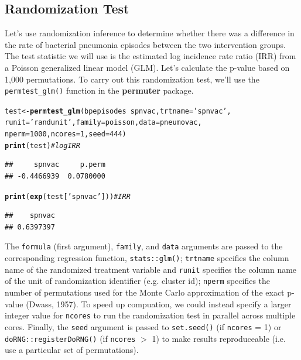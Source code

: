\documentclass[12pt]{article}\usepackage[]{graphicx}\usepackage[]{color}
\makeatletter
\newcommand{\hlnum}[1]{\textcolor[rgb]{0.686,0.059,0.569}{#1}}%
\newcommand{\hlstr}[1]{\textcolor[rgb]{0.192,0.494,0.8}{#1}}%
\newcommand{\hlcom}[1]{\textcolor[rgb]{0.678,0.584,0.686}{\textit{#1}}}%
\newcommand{\hlopt}[1]{\textcolor[rgb]{0,0,0}{#1}}%
\newcommand{\hlstd}[1]{\textcolor[rgb]{0.345,0.345,0.345}{#1}}%
\newcommand{\hlkwb}[1]{\textcolor[rgb]{0.69,0.353,0.396}{#1}}%
\newcommand{\hlkwc}[1]{\textcolor[rgb]{0.333,0.667,0.333}{#1}}%
\newcommand{\hlkwd}[1]{\textcolor[rgb]{0.737,0.353,0.396}{\textbf{#1}}}%
\newenvironment{kframe}{%
 \def\at@end@of@kframe{}%
 \ifinner\ifhmode%
  \def\at@end@of@kframe{\end{minipage}}%
  \begin{minipage}{\columnwidth}%
 \fi\fi%
 \def\FrameCommand##1{\hskip\@totalleftmargin \hskip-\fboxsep
 \colorbox{shadecolor}{##1}\hskip-\fboxsep
     \hskip-\linewidth \hskip-\@totalleftmargin \hskip\columnwidth}%
 \MakeFramed {\advance\hsize-\width
   \@totalleftmargin\z@ \linewidth\hsize
   \@setminipage}}%
 {\par\unskip\endMakeFramed%
 \at@end@of@kframe}
\newenvironment{knitrout}{}{} %
\makeatother
\begin{document}
\subsection{Randomization Test}
Let's use randomization inference to determine whether there was a difference in the rate of bacterial pneumonia episodes between the two intervention groups. The test statistic we will use is the estimated log incidence rate ratio (IRR) from a Poisson generalized linear model (GLM). Let's calculate the p-value based on 1,000 permutations. To carry out this randomization test, we'll use the \texttt{permtest\_glm()} function in the \textbf{permuter} package.
\begin{knitrout}
\color{fgcolor}\begin{kframe}
\begin{alltt}
\hlstd{test} \hlkwb{<-} \hlkwd{permtest_glm}\hlstd{(bpepisodes} \hlopt{~} \hlstd{spnvac,} \hlkwc{trtname} \hlstd{=} \hlstr{'spnvac'}\hlstd{,}
                     \hlkwc{runit} \hlstd{=} \hlstr{'randunit'}\hlstd{,} \hlkwc{family} \hlstd{= poisson,} \hlkwc{data} \hlstd{= pneumovac,}
                     \hlkwc{nperm} \hlstd{=} \hlnum{1000}\hlstd{,} \hlkwc{ncores} \hlstd{=} \hlnum{1}\hlstd{,} \hlkwc{seed} \hlstd{=} \hlnum{444}\hlstd{)}
\hlkwd{print}\hlstd{(test)} \hlcom{# logIRR}
\end{alltt}
\begin{verbatim}
##     spnvac     p.perm 
## -0.4466939  0.0780000
\end{verbatim}
\begin{alltt}
\hlkwd{print}\hlstd{(}\hlkwd{exp}\hlstd{(test[}\hlstr{'spnvac'}\hlstd{]))} \hlcom{# IRR}
\end{alltt}
\begin{verbatim}
##    spnvac 
## 0.6397397
\end{verbatim}
\end{kframe}
\end{knitrout}
The \texttt{formula} (first argument), \texttt{family}, and \texttt{data} arguments are passed to the corresponding regression function, \texttt{stats::glm()}; \texttt{trtname} specifies the column name of the randomized treatment variable and \texttt{runit} specifies the column name of the unit of randomization identifier (e.g. cluster id); \texttt{nperm} specifies the number of permutations used for the Monte Carlo approximation of the exact p-value (Dwass, 1957). To speed up compuation, we could instead specify a larger integer value for \texttt{ncores} to run the randomization test in parallel across multiple cores. Finally, the \texttt{seed} argument is passed to \texttt{set.seed()} (if \texttt{ncores} = 1) or \texttt{doRNG::registerDoRNG()} (if \texttt{ncores} $>$ 1) to make results reproduceable (i.e. use a particular set of permutations).
\end{document}
